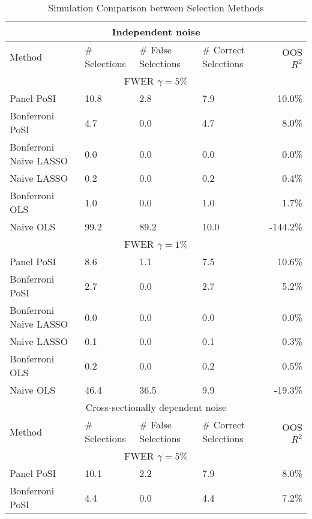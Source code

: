 \documentclass[11pt]{article}
\newcommand\tcaptab[1]{\captionsetup{position=top, font=normalsize, labelfont=bf, textfont=normalfont, justification=centering, margin=0mm, aboveskip=1mm, belowskip=0mm, labelsep=colon, singlelinecheck=false}\caption{#1}}
\begin{document}
	
	\begin{table}[t!]
		\tcaptab{Simulation Comparison between Selection Methods}\label{tab:sim_results}
		\centering
			\renewcommand{\arraystretch}{1.0}
			{\small
				\begin{tabular}{@{}llllr@{}}
					\toprule \midrule
					\multicolumn{5}{c}{Independent noise}   \\ \midrule \midrule
					Method & \# Selections & \# False Selections &  \# Correct Selections &  OOS $R^2$ \\ \midrule 
					\multicolumn{5}{c}{FWER $\gamma=5\%$}   \\ \midrule
					Panel PoSI             & 10.8 & 2.8  & 7.9  & 10.0\%    \\
					Bonferroni PoSI        & 4.7  & 0.0  & 4.7  & 8.0\%     \\
					Bonferroni Naive LASSO & 0.0  & 0.0  & 0.0  & 0.0\%     \\
					Naive LASSO            & 0.2  & 0.0  & 0.2  & 0.4\%    \\
					Bonferroni OLS         & 1.0  & 0.0  & 1.0  & 1.7\%    \\
					Naive OLS              & 99.2 & 89.2 & 10.0 & -144.2\%  \\      \midrule
					\multicolumn{5}{c}{FWER $\gamma=1\%$}   \\ \midrule
					Panel PoSI             & 8.6  & 1.1  & 7.5 & 10.6\%  \\
					Bonferroni PoSI        & 2.7  & 0.0  & 2.7 & 5.2\%   \\
					Bonferroni Naive LASSO & 0.0  & 0.0  & 0.0 & 0.0\%   \\
					Naive LASSO            & 0.1  & 0.0  & 0.1 & 0.3\%    \\
					Bonferroni OLS         & 0.2  & 0.0  & 0.2 & 0.5\%    \\
					Naive OLS              & 46.4 & 36.5 & 9.9 & -19.3\% \\     \midrule \midrule
					\multicolumn{5}{c}{Cross-sectionally dependent noise}   \\ \midrule \midrule
					Method & \# Selections & \# False Selections &  \# Correct Selections &  OOS $R^2$ \\ \midrule 
					\multicolumn{5}{c}{FWER $\gamma=5\%$}   \\ \midrule
					Panel PoSI             & 10.1 & 2.2  & 7.9  & 8.0\%   \\
					Bonferroni PoSI        & 4.4  & 0.0  & 4.4  & 7.2\%    \\

\end{tabular}}
\end{table}
\end{document}
